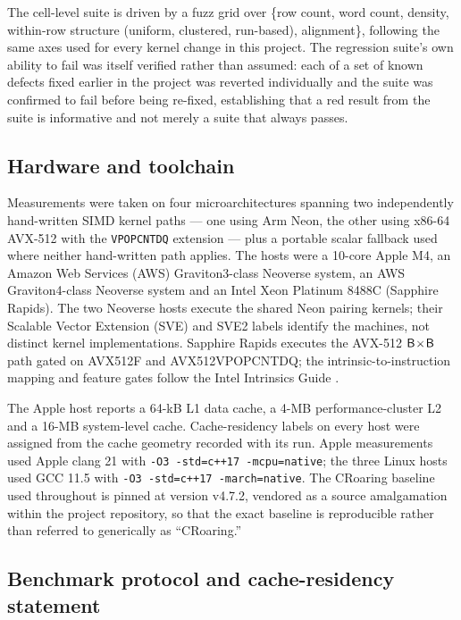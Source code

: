 The cell-level suite is driven by a fuzz grid over \{row count, word count, density, within-row
structure (uniform, clustered, run-based), alignment\}, following the same axes used for every kernel
change in this project. The regression suite's own ability to fail was itself verified rather than
assumed: each of a set of known defects fixed earlier in the project was reverted individually and the
suite was confirmed to fail before being re-fixed, establishing that a red result from the suite is
informative and not merely a suite that always passes.

\subsection*{Hardware and toolchain}

Measurements were taken on four microarchitectures spanning two independently hand-written SIMD kernel paths --- one using Arm
Neon, the other using x86-64 AVX-512 with the \texttt{VPOPCNTDQ} extension --- plus a portable scalar
fallback used where neither hand-written path applies. The hosts were a 10-core Apple M4, an Amazon
Web Services (AWS) Graviton3-class Neoverse system, an AWS Graviton4-class Neoverse system and an Intel Xeon Platinum
8488C (Sapphire Rapids). The two Neoverse hosts execute the shared Neon pairing kernels; their
Scalable Vector Extension (SVE) and SVE2 labels identify the machines, not distinct kernel implementations. Sapphire Rapids executes
the AVX-512 $\textsf{B}\!\times\!\textsf{B}$ path gated on AVX512F and AVX512VPOPCNTDQ; the intrinsic-to-instruction
mapping and feature gates follow the Intel Intrinsics Guide \cite{intel-intrinsics-guide}.

The Apple host reports a 64-kB L1 data cache, a 4-MB performance-cluster L2 and a 16-MB system-level
cache. Cache-residency labels on every host were assigned from the cache geometry recorded with its
run. Apple measurements used Apple clang 21 with \texttt{-O3 -std=c++17 -mcpu=native}; the three
Linux hosts used GCC 11.5 with \texttt{-O3 -std=c++17 -march=native}. The CRoaring baseline used
throughout is pinned at version v4.7.2,
vendored as a source amalgamation within the project repository, so that the exact baseline is
reproducible rather than referred to generically as ``CRoaring.''

\subsection*{Benchmark protocol and cache-residency statement}

